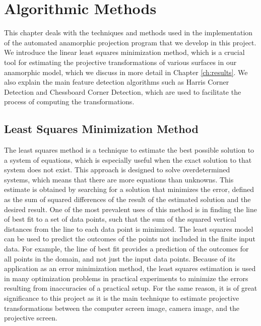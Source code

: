 \documentclass[11pt, oneside, reqno]{book}
\begin{document}

\chapter{Algorithmic Methods}
\label{chap:algorithmic}

This chapter deals with the techniques and methods used in the implementation of the automated anamorphic projection program that we develop in this project. We introduce the linear least squares minimization method, which is a crucial tool for estimating the projective transformations of various surfaces in our anamorphic model, which we discuss in more detail in Chapter \ref{ch:results}. We also explain the main feature detection algorithms such as Harris Corner Detection and Chessboard Corner Detection, which are used to facilitate the process of computing the transformations.




\section{Least Squares Minimization Method}
\label{sec:leastSquares}

The least squares method is a technique to estimate the best possible solution to a system of equations, which is especially useful when the exact solution to that system does not exist. This approach is designed to solve overdetermined systems, which means that there are more equations than unknowns. This estimate is obtained by searching for a solution that minimizes the error, defined as the sum of squared differences of the result of the estimated solution and the desired result. One of the most prevalent uses of this method is in finding the line of best fit to a set of data points, such that the sum of the squared vertical distances from the line to each data point is minimized. 
The least squares model can be used to predict the outcomes of the points not included in the finite input data. For example, the line of best fit provides a prediction of the outcomes for all points in the domain, and not just the input data points.
Because of its application as an error minimization method, the least squares estimation is used in many optimization problems in practical experiments to minimize the errors resulting from inaccuracies of a practical setup. For the same reason, it is of great significance to this project as it is the main technique to estimate projective transformations between the computer screen image, camera image, and the projective screen. 
\end{document}
